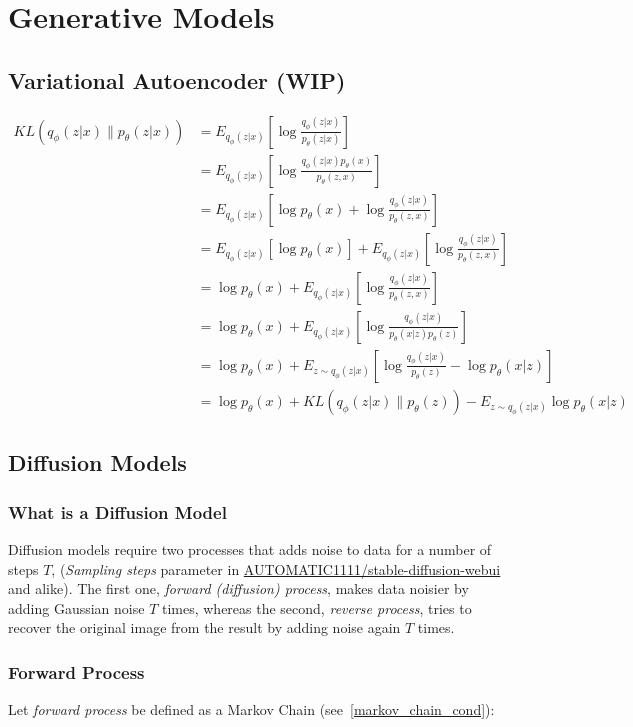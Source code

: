 \documentclass{article}
\numberwithin{equation}{subsection}
\begin{document}
\section{Generative Models}
\subsection{Variational Autoencoder (WIP)}
\begin{align}
KL(q_\phi(z|x) \parallel p_\theta(z|x))
&=E_{q_\phi(z|x)}\left[ \log\frac{q_\phi(z|x)}{p_\theta(z|x)}\right]\\
&=E_{q_\phi(z|x)}\left[ \log\frac{q_\phi(z|x)p_\theta(x)}{p_\theta(z,x)}\right]\\
&=E_{q_\phi(z|x)}\left[ \log p_\theta(x) + \log\frac{q_\phi(z|x)}{p_\theta(z,x)}\right]\\
&=E_{q_\phi(z|x)}\left[\log p_\theta(x)\right] + E_{q_\phi(z|x)}\left[\log\frac{q_\phi(z|x)}{p_\theta(z,x)}\right]\\
&=\log p_\theta(x) + E_{q_\phi(z|x)}\left[\log\frac{q_\phi(z|x)}{p_\theta(z,x)}\right]\\
&=\log p_\theta(x) + E_{q_\phi(z|x)}\left[\log\frac{q_\phi(z|x)}{p_\theta(x|z)p_\theta(z)}\right]\\
&=\log p_\theta(x) + E_{z\sim q_\phi(z|x)}\left[\log \frac{q_\phi(z|x)}{p_\theta(z)} - \log p_\theta(x| z)\right]\\
&=\log p_\theta(x) + KL(q_\phi(z|x) \parallel p_\theta(z)) - E_{z\sim q_\phi(z|x)}\log p_\theta(x|z)
\end{align}
\subsection{Diffusion Models}
\subsubsection{What is a Diffusion Model}

Diffusion models require two processes that adds noise to data for a number of steps $T$, (\textit{Sampling steps} parameter in \href{https://github.com/AUTOMATIC1111/stable-diffusion-webui}{AUTOMATIC1111/stable-diffusion-webui} and alike). The first one, \textit{forward (diffusion) process}, makes data noisier by adding Gaussian noise $T$ times, whereas the second, \textit{reverse process}, tries to recover the original image from the result by adding noise again $T$ times. 
\subsubsection{Forward Process}
Let \textit{forward process} be defined as a Markov Chain (see~\ref{markov_chain_cond}):
\end{document}
